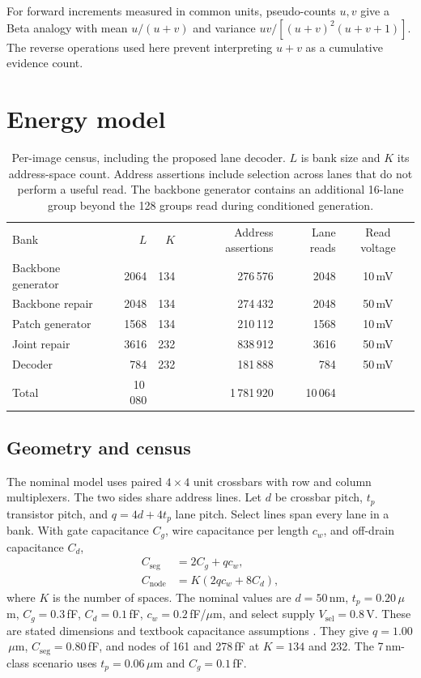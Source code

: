 \documentclass[reprint,amsmath,amssymb,aps,pra,floatfix,nofootinbib]{revtex4-2}
\begin{document}
For forward increments measured in common units, pseudo-counts $u,v$ give a Beta analogy with mean $u/(u+v)$ and variance $uv/[(u+v)^2(u+v+1)]$. The reverse operations used here prevent interpreting $u+v$ as a cumulative evidence count.

\section{Energy model}\label{app:energy}
\begin{table}[tp]
\caption{Per-image census, including the proposed lane decoder. $L$ is bank size and $K$ its address-space count. Address assertions include selection across lanes that do not perform a useful read. The backbone generator contains an additional 16-lane group beyond the 128 groups read during conditioned generation.}
\label{tab:census}
\begin{ruledtabular}
\begin{tabular}{lrrrrc}
Bank & $L$ & $K$ & Address assertions & Lane reads & Read voltage\\
\colrule
Backbone generator & 2064 & 134 & 276\,576 & 2048 & 10\,mV\\
Backbone repair & 2048 & 134 & 274\,432 & 2048 & 50\,mV\\
Patch generator & 1568 & 134 & 210\,112 & 1568 & 10\,mV\\
Joint repair & 3616 & 232 & 838\,912 & 3616 & 50\,mV\\
Decoder & 784 & 232 & 181\,888 & 784 & 50\,mV\\
\colrule
Total & 10\,080 & & 1\,781\,920 & 10\,064 &\\
\end{tabular}
\end{ruledtabular}
\end{table}

\subsection{Geometry and census}
The nominal model uses paired $4\times4$ unit crossbars with row and column multiplexers. The two sides share address lines. Let $d$ be crossbar pitch, $t_p$ transistor pitch, and $q=4d+4t_p$ lane pitch. Select lines span every lane in a bank. With gate capacitance $C_g$, wire capacitance per length $c_w$, and off-drain capacitance $C_d$,
\begin{align}
C_{\mathrm{seg}}&=2C_g+q c_w,\\
C_{\mathrm{node}}&=K(2q c_w+8C_d),
\end{align}
where $K$ is the number of spaces. The nominal values are $d=50$\,nm, $t_p=0.20$\,$\mu$m, $C_g=0.3$\,fF, $C_d=0.1$\,fF, $c_w=0.2$\,fF/$\mu$m, and select supply $V_{\mathrm{sel}}=0.8$\,V. These are stated dimensions and textbook capacitance assumptions \cite{weste2011cmos}. They give $q=1.00$\,$\mu$m, $C_{\mathrm{seg}}=0.80$\,fF, and nodes of 161 and 278\,fF at $K=134$ and 232. The 7\,nm-class scenario uses $t_p=0.06$\,$\mu$m and $C_g=0.1$\,fF.
\end{document}
